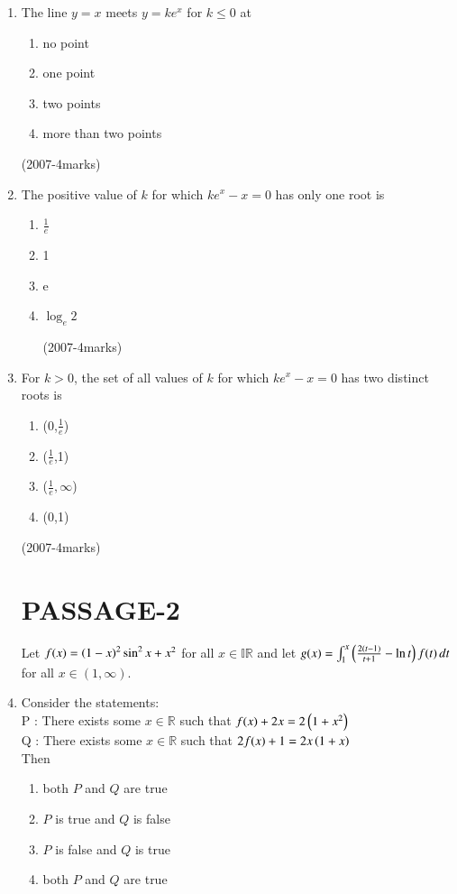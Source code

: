 \documentclass[journal,,12pt,twocolumn]{IEEEtran}
\theoremstyle{remark}
\begin{document}
\begin{enumerate}
\item The line $y=x$ meets $y=ke^x$ for $k \le 0$ at
    \begin{enumerate}[label=(\alph*)]
\item no point
\item one point
\item two points
\item more than two points
\end{enumerate}

  
\hfill {(2007-4marks)}\\


\item  The positive value of $k$ for which $ke^x-x=0$ has only one root is
\begin{enumerate}[label=(\alph*)]
\item $\frac{1}{e}$
\item 1
\item e
\item $\log_e2$

\hfill {(2007-4marks)}

\end{enumerate}
\item For $k>0$, the set of all values of $k$ for which $ke^x-x=0$ has two distinct roots is 
\begin{enumerate}[label=(\alph*)]
\item (0,$\frac{1}{e}$)
\item ($\frac{1}{e}$,1)
\item ($\frac{1}{e},\infty$)
\item (0,1)
\end{enumerate}

\hfill {(2007-4marks)}


\section*{PASSAGE-2}
Let $f(x)=\left(1-x\right)^2 \sin^2 x + x^2$ for all $x \in \mathbb{IR}$ and let $g(x)=
\int_{1}^{x} \left(\frac{2(t-1)}{t+1} - \ln t\right)  f(t) \, dt $ for all $x \in (1 ,\infty)$.
\item Consider the statements:\\
P : There exists some $x \in \mathbb{R}$ such that $f(x) + 2x = 2\left(1+x^2\right)$\\
Q : There exists some $x \in\mathbb{R}$ such that $2f(x) + 1 = 2x\left(1+x\right)$\\
    Then
\begin{enumerate}[label=(\alph*)]
\item both $P$ and $Q$ are true
\item $P$ is true and $Q$ is false
\item $P$ is false and $Q$ is true
\item both $P$ and $Q$ are true
\end{enumerate}


\end{enumerate}
\end{document}
